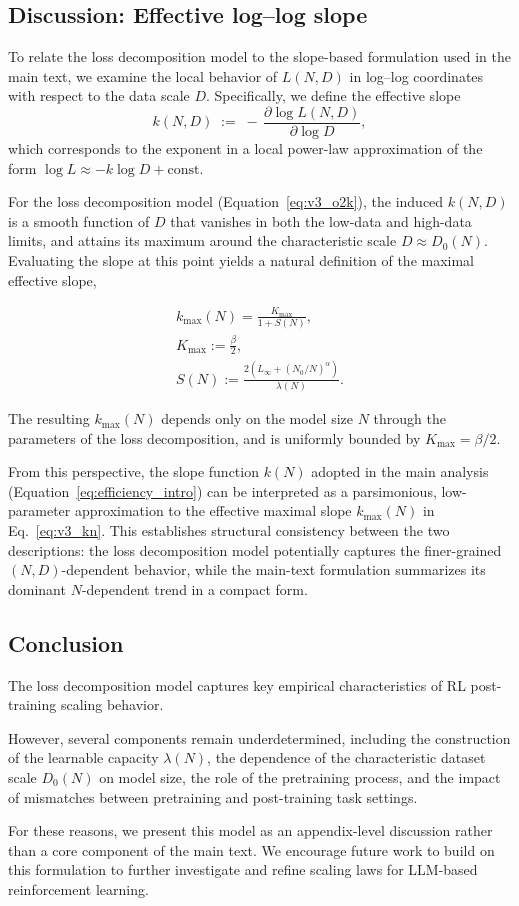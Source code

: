 \subsection{Discussion: Effective log--log slope}

To relate the loss decomposition model to the slope-based formulation used in the main text, we examine the local behavior of $L(N,D)$ in log--log coordinates with respect to the data scale $D$.  
Specifically, we define the effective slope
\[
k(N,D)\;:=\; -\,\frac{\partial \log L(N,D)}{\partial \log D},
\]
which corresponds to the exponent in a local power-law approximation of the form
$\log L \approx -k \log D + \text{const}$.

For the loss decomposition model (Equation~\eqref{eq:v3_o2k}), the induced $k(N,D)$ is a smooth function of $D$ that vanishes in both the low-data and high-data limits, and attains its maximum around the characteristic scale $D \approx D_0(N)$.  
Evaluating the slope at this point yields a natural definition of the maximal effective slope,

\begin{align}
\label{eq:v3_kn}
    k_{\max}(N)
    =
    \frac{K_{\max}}{1 + S(N)}, \\
    K_{\max}:= \frac{\beta}{2},\\
    S(N):=
    \frac{2\!\left(L_{\infty} + (N_0/N)^{\alpha}\right)}{\lambda(N)}.
\end{align}


The resulting $k_{\max}(N)$ depends only on the model size $N$ through the parameters of the loss decomposition, and is uniformly bounded by $K_{\max}=\beta/2$.

From this perspective, the slope function $k(N)$ adopted in the main analysis (Equation~\eqref{eq:efficiency_intro}) can be interpreted as a parsimonious, low-parameter approximation to the effective maximal slope $k_{\max}(N)$ in Eq.~\ref{eq:v3_kn}.
This establishes structural consistency between the two descriptions: the loss decomposition model potentially captures the finer-grained $(N,D)$-dependent behavior, while the main-text formulation summarizes its dominant $N$-dependent trend in a compact form.

\subsection{Conclusion}

The loss decomposition model captures key empirical characteristics of RL post-training scaling behavior.

However, several components remain underdetermined, including the construction of the learnable capacity $\lambda(N)$, the dependence of the characteristic dataset scale $D_0(N)$ on model size, the role of the pretraining process, and the impact of mismatches between pretraining and post-training task settings.

For these reasons, we present this model as an appendix-level discussion rather than a core component of the main text.
We encourage future work to build on this formulation to further investigate and refine scaling laws for LLM-based reinforcement learning.
